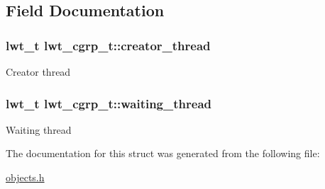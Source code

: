 \subsection{Field Documentation}
\hypertarget{structlwt__cgrp_af86699c56fb03f7a348fa606510af33b}{
\subsubsection[{creator\+\_\+thread}]{\setlength{\rightskip}{0pt plus 5cm}lwt\+\_\+t lwt\+\_\+cgrp\+\_\+t\+::creator\+\_\+thread}}\label{structlwt__cgrp_af86699c56fb03f7a348fa606510af33b}
Creator thread \hypertarget{structlwt__cgrp_ac77ed0ee0cf31bd27b995749f819c32b}{
\subsubsection[{waiting\+\_\+thread}]{\setlength{\rightskip}{0pt plus 5cm}lwt\+\_\+t lwt\+\_\+cgrp\+\_\+t\+::waiting\+\_\+thread}}\label{structlwt__cgrp_ac77ed0ee0cf31bd27b995749f819c32b}
Waiting thread 

The documentation for this struct was generated from the following file\+:\begin{DoxyCompactItemize}
\item 
\hyperlink{objects_8h}{objects.\+h}\end{DoxyCompactItemize}
